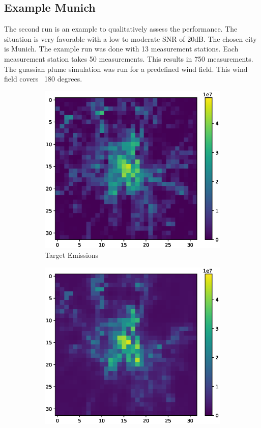 \subsection{Example Munich}
The second run is an example to qualitatively assess the performance.
The situation is very favorable with a low to moderate SNR of 20dB.
The chosen city is Munich.
The example run was done with 13 measurement stations.
Each measurement station takes 50 measurements.
This results in 750 measurements.
The guassian plume simulation was run for a predefined wind field.
This wind field covers ~180 degrees.
\begin{figure}
    \centering
    \begin{subfigure}[b]{0.32\textwidth}
        \includegraphics[width=\textwidth]{figures/06_results/gaussian_plume_example/munich/target.eps}
        \caption{Target Emissions}
    \end{subfigure}
    \begin{subfigure}[b]{0.32\textwidth}
        \includegraphics[width=\textwidth]{figures/06_results/gaussian_plume_example/munich/gen_2048_fine_tuned_20_db.eps}

\end{subfigure}
\end{figure}
